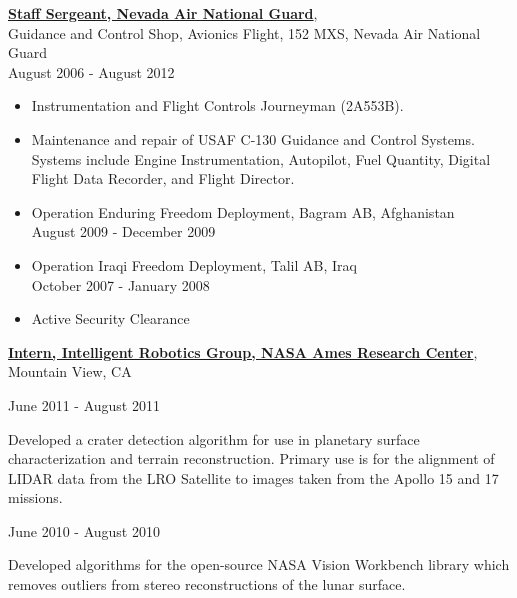 \documentclass[10pt]{article}
\newenvironment{outerlist}[1][\enskip\textbullet]%
        {\begin{itemize}[#1]}{\end{itemize}%
         \vspace{-.6\baselineskip}}
\newenvironment{innerlist}[1][\enskip\textbullet]%
        {\begin{compactitem}[#1]}{\end{compactitem}}
\begin{document}
\href{http://www.nv.ngb.army.mil/air/index.cfm}
     {\textbf{Staff Sergeant, Nevada Air National Guard}},\\
     Guidance and Control Shop, Avionics Flight, 152 MXS, Nevada Air National Guard\\
     August 2006 - August 2012
     \begin{outerlist}
     \item Instrumentation and Flight Controls Journeyman (2A553B).
     \item Maintenance and repair of USAF C-130 Guidance and Control Systems. Systems
           include Engine Instrumentation, Autopilot, Fuel Quantity,
           Digital Flight Data Recorder, and Flight Director.
     \item Operation Enduring Freedom Deployment, Bagram AB, Afghanistan\\     
           August 2009 - December 2009
     \item Operation Iraqi Freedom Deployment, Talil AB, Iraq\\               
           October 2007 - January 2008
     \item Active Security Clearance\\
     \end{outerlist}
\href{http://ti.arc.nasa.gov/tech/asr/intelligent-robotics/}
     {\textbf{Intern, Intelligent Robotics Group, NASA Ames Research Center}},\\
      Mountain View, CA \hspace{48mm}
      
      \begin{outerlist}
      \item June 2011 - August 2011
         \begin{innerlist}
         \item[] Developed a crater detection algorithm for use in planetary
               surface characterization and terrain reconstruction. Primary use
               is for the alignment of LIDAR data from the LRO Satellite
               to images taken from the Apollo 15 and 17 missions.
         \end{innerlist}
      
      \item June 2010 - August 2010
      \begin{innerlist}
      \item[] Developed algorithms for the open-source NASA Vision Workbench library
            which removes outliers from stereo reconstructions of the lunar surface.\\
      \end{innerlist}
      \end{outerlist}
\end{document}
